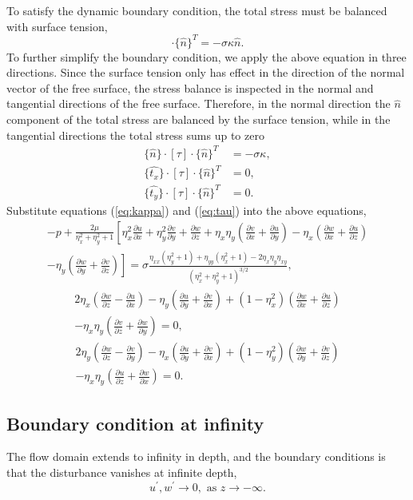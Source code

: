To satisfy the dynamic boundary condition, the total stress must be balanced with surface tension,
\begin{equation}
    [ \tau ] \cdot \{\hat{n}\}^T = -\sigma\kappa\hat{n}.
\end{equation}
To further simplify the boundary condition, we apply the above equation in three directions. Since the surface tension only has effect in the direction of the normal vector of the free surface, the stress balance is inspected in the normal and tangential directions of the free surface. Therefore, in the normal direction the $\hat{n}$ component of the total stress are balanced by the surface tension, while in the tangential directions the total stress sums up to zero
\begin{align}
    \{\hat{n}\} \cdotp [ \tau ] \cdotp \{\hat{n}\}^{T} &=-\sigma \kappa, \\
    \{\hat{t_x}\} \cdotp [ \tau ] \cdotp \{\hat{n}\}^{T} &=0, \\
    \{\hat{t_y}\} \cdotp [ \tau ] \cdotp \{\hat{n}\}^{T} &=0.
\end{align}
Substitute equations (\ref{eq:kappa}) and (\ref{eq:tau}) into the above equations,
\begin{multline}
    -p+\frac{2\mu }{\eta _{x}^{2} +\eta _{y}^{2} +1}\left[ \eta _{x}^{2}\frac{\partial u}{\partial x} +\eta _{y}^{2}\frac{\partial v}{\partial y} +\frac{\partial w}{\partial z}
    +\eta _{x} \eta _{y}\left(\frac{\partial v}{\partial x} +\frac{\partial u}{\partial y}\right)-\eta _{x}\left(\frac{\partial w}{\partial x} +\frac{\partial u}{\partial z}\right) \right.\\
    \left.-\eta _{y}\left(\frac{\partial w}{\partial y} +\frac{\partial v}{\partial z}\right)\right]    =\sigma \frac{\eta _{xx}\left( \eta _{y}^{2} +1\right) +\eta _{yy}\left( \eta _{x}^{2} +1\right) -2\eta _{x} \eta _{y} \eta _{xy}}{\left( \eta _{x}^{2} +\eta _{y}^{2} +1\right)^{3/2}},
\end{multline}
\begin{multline}
2\eta _{x}\left(\frac{\partial w}{\partial z} -\frac{\partial u}{\partial x}\right) -\eta _{y}\left(\frac{\partial u}{\partial y} +\frac{\partial v}{\partial x}\right) +\left( 1-\eta _{x}^{2}\right)\left(\frac{\partial w}{\partial x} +\frac{\partial u}{\partial z}\right) \\
-\eta _{x} \eta _{y}\left(\frac{\partial v}{\partial z} +\frac{\partial w}{\partial y}\right) =0,
\end{multline}
\begin{multline}
2\eta _{y}\left(\frac{\partial w}{\partial z} -\frac{\partial v}{\partial y}\right) -\eta _{x}\left(\frac{\partial u}{\partial y} +\frac{\partial v}{\partial x}\right) +\left( 1-\eta _{y}^{2}\right)\left(\frac{\partial w}{\partial y} +\frac{\partial v}{\partial z}\right) \\ 
-\eta _{x} \eta _{y}\left(\frac{\partial u}{\partial z} +\frac{\partial w}{\partial x}\right) =0.
\end{multline}


\subsection{Boundary condition at infinity}
The flow domain extends to infinity in depth, and the boundary conditions is that the disturbance vanishes at infinite depth,
\begin{equation}
    u^\prime,w^\prime\rightarrow 0, \text{ as } z\rightarrow -\infty.
    \label{eq:bbc1}
\end{equation}